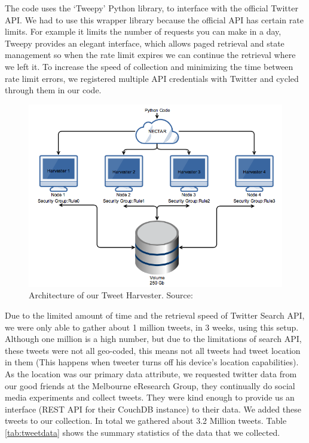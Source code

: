 \documentclass[12pt]{report}
\theoremstyle{named}
\begin{document}
The code uses the `Tweepy'\cite{Tweepy} Python library, to interface with the official Twitter API. We had to use this wrapper library because the official API has certain rate limits. For example it limits the number of requests you can make in a day, Tweepy provides an elegant interface, which allows paged retrieval and state management so when the rate limit expires we can continue the retrieval where we left it. To increase the speed of collection and minimizing the time between rate limit errors, we registered multiple API credentials with Twitter and cycled through them in our code.

\begin{figure}[ht]
\centering
        \includegraphics[width=120mm,scale=1]{Images/TweetHarvesting.png}
    \caption{Architecture of our Tweet Harvester. Source: \cite{clusterCloudReport}}
    \label{fig:tweetHarvester}
\end{figure}

Due to the limited amount of time and the retrieval speed of Twitter Search API, we were only able to gather about 1 million tweets, in 3 weeks, using this setup. Although one million is a high number, but due to the limitations of search API, these tweets were not all geo-coded, this means not all tweets had tweet location in them (This happens when tweeter turns off his device's location capabilities). As the location was our primary data attribute, we requested twitter data from our good friends at the Melbourne eResearch Group, they continually do social media experiments and collect tweets. They were kind enough to provide us an interface (REST API for their CouchDB instance) to their data. We added these tweets to our collection. In total we gathered about 3.2 Million tweets. Table \ref{tab:tweetdata} shows the summary statistics of the data that we collected.
\end{document}
